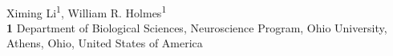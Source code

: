 \documentclass[10pt,letterpaper]{article}
\date{}
\begin{document}
\vspace*{0.2in}

\begin{flushleft}
{\Large
\textbf{} %
}
\newline
\\
Ximing Li\textsuperscript{1},
William R. Holmes\textsuperscript{1}
\\
\bigskip
\textbf{1} Department of Biological Sciences, Neuroscience Program, Ohio University, Athens, Ohio, United States of America
\\
\bigskip

% 
%



\end{flushleft}
\end{document}
